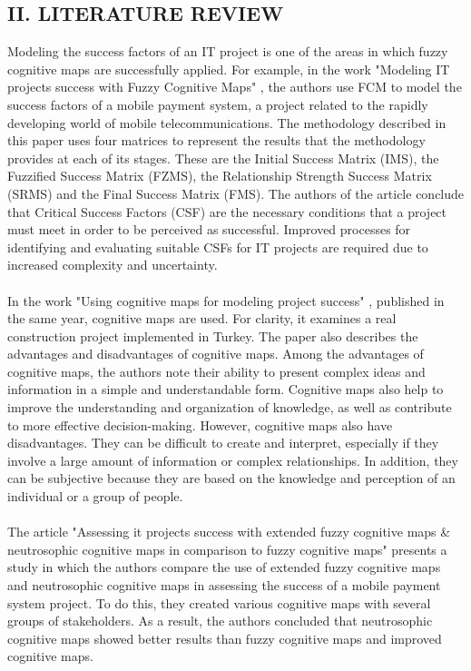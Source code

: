 \documentclass{article}
\begin{document}
\begin{minipage}{0.49\textwidth}
\begin{center}
            \chapter{II. LITERATURE REVIEW}
        \end{center}
        Modeling the success factors of an IT project is one of the areas in which fuzzy cognitive maps are successfully applied. For example, in the work "{}Modeling IT projects success with Fuzzy Cognitive Maps"{} \cite{litlink18}, the authors use FCM to model the success factors of a mobile payment system, a project related to the rapidly developing world of mobile telecommunications. The methodology described in this paper uses four matrices to represent the results that the methodology provides at each of its stages. These are the Initial Success Matrix (IMS), the Fuzzified Success Matrix (FZMS), the Relationship Strength Success Matrix (SRMS) and the Final Success Matrix (FMS). The authors of the article conclude that Critical Success Factors (CSF) are the necessary conditions that a project must meet in order to be perceived as successful. Improved processes for identifying and evaluating suitable CSFs for IT projects are required due to increased complexity and uncertainty.\\
        ~\\
        In the work "{}Using cognitive maps for modeling project success"{} \cite{litlink19}, published in the same year, cognitive maps are used. For clarity, it examines a real construction project implemented in Turkey. The paper also describes the advantages and disadvantages of cognitive maps. Among the advantages of cognitive maps, the authors note their ability to present complex ideas and information in a simple and understandable form. Cognitive maps also help to improve the understanding and organization of knowledge, as well as contribute to more effective decision-making. However, cognitive maps also have disadvantages. They can be difficult to create and interpret, especially if they involve a large amount of information or complex relationships. In addition, they can be subjective because they are based on the knowledge and perception of an individual or a group of people.\\
        ~\\
        The article "{}Assessing it projects success with extended fuzzy cognitive maps \& neutrosophic cognitive maps in comparison to fuzzy cognitive maps"{} \cite{litlink20} presents a study in which the authors compare the use of extended fuzzy cognitive maps and neutrosophic cognitive maps in assessing the success of a mobile payment system project. To do this, they created various cognitive maps with several groups of stakeholders. As a result, the authors concluded that neutrosophic cognitive maps showed better results than fuzzy cognitive maps and improved cognitive maps.\\

\end{minipage}
\end{document}
